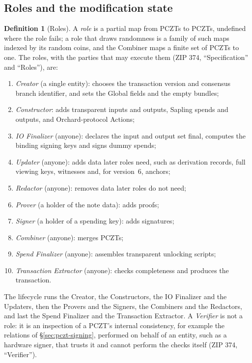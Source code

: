 \documentclass[11pt,a4paper]{article}
\theoremstyle{definition}
\newtheorem{definition}[theorem]{Definition}
\begin{document}
\subsection{Roles and the modification state}\label{sec:pczt-roles}

\begin{definition}[Roles]\label{def:pczt-roles}
A \emph{role} is a partial map from PCZTs to PCZTs, undefined where the role
fails; a role that draws randomness is a family of such maps indexed by its
random coins, and the Combiner maps a finite set of PCZTs to one. The roles,
with the parties that may execute them (ZIP 374, ``Specification'' and
``Roles''), are:
\begin{enumerate}[label=(\arabic*)]
\item \emph{Creator} (a single entity): chooses the transaction version and
  consensus branch identifier, and sets the Global fields and the empty
  bundles;
\item \emph{Constructor}: adds transparent inputs and outputs, Sapling
  spends and outputs, and Orchard-protocol Actions;
\item \emph{IO Finalizer} (anyone): declares the input and output set
  final, computes the binding signing keys and signs dummy spends;
\item \emph{Updater} (anyone): adds data later roles need, such as
  derivation records, full viewing keys, witnesses and, for version~$6$,
  anchors;
\item \emph{Redactor} (anyone): removes data later roles do not need;
\item \emph{Prover} (a holder of the note data): adds proofs;
\item \emph{Signer} (a holder of a spending key): adds signatures;
\item \emph{Combiner} (anyone): merges PCZTs;
\item \emph{Spend Finalizer} (anyone): assembles transparent unlocking
  scripts;
\item \emph{Transaction Extractor} (anyone): checks completeness and
  produces the transaction.
\end{enumerate}
The lifecycle runs the Creator, the Constructors, the IO Finalizer and the
Updaters, then the Provers and the Signers, the Combiners and the
Redactors, and last the Spend Finalizer and the Transaction Extractor. A
\emph{Verifier} is not a role: it is an inspection of a PCZT's internal
consistency, for example the relations of \S\ref{sec:pczt-signing},
performed on behalf of an entity, such as a hardware signer, that trusts it
and cannot perform the checks itself (ZIP 374, ``Verifier'').
\end{definition}
\end{document}
